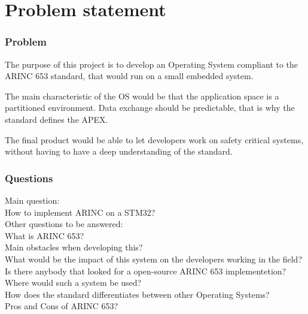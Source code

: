 \chapter{Problem statement}

\subsection{Problem}

The purpose of this project is to develop an Operating System compliant to the ARINC 653 standard, that would run on a small embedded system. 

The main characteristic of the OS would be that the application space is a partitioned environment.
Data exchange should be predictable, that is why the standard defines the APEX.

The final product would be able to let developers work on safety critical systems,
 without having to have a deep understanding of the standard.

\subsection{Questions}

Main question:\\
How to implement ARINC on a STM32?\\

Other questions to be answered:\\
What is ARINC 653?\\
Main obstacles when developing this?\\
What would be the impact of this system on the developers working in the field?\\
Is there anybody that looked for a open-source ARINC 653 implementetion?\\
Where would such a system be used?\\
How does the standard differentiates between other Operating Systems?\\
Pros and Cons of ARINC 653?\\